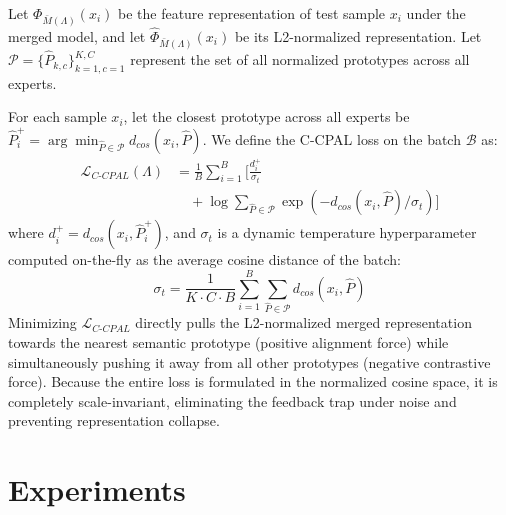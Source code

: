 \documentclass{article}
\theoremstyle{plain}
\theoremstyle{definition}
\theoremstyle{remark}
\begin{document}
Let $\Phi_{\bar{M}(\Lambda)}(x_i)$ be the feature representation of test sample $x_i$ under the merged model, and let $\hat{\Phi}_{\bar{M}(\Lambda)}(x_i)$ be its L2-normalized representation. Let $\mathcal{P} = \{\hat{P}_{k,c}\}_{k=1, c=1}^{K, C}$ represent the set of all normalized prototypes across all experts.

For each sample $x_i$, let the closest prototype across all experts be $\hat{P}_i^+ = \arg\min_{\hat{P} \in \mathcal{P}} d_{cos}(x_i, \hat{P})$.
We define the C-CPAL loss on the batch $\mathcal{B}$ as:
\begin{equation}
\begin{split}
\mathcal{L}_{C\text{-}CPAL}(\Lambda) &= \frac{1}{B} \sum_{i=1}^B \bigg[ \frac{d_i^+}{\sigma_t} \\
&\quad + \log \sum_{\hat{P} \in \mathcal{P}} \exp\left(-d_{cos}(x_i, \hat{P}) / \sigma_t\right) \bigg]
\end{split}
\end{equation}
where $d_i^+ = d_{cos}(x_i, \hat{P}_i^+)$, and $\sigma_t$ is a dynamic temperature hyperparameter computed on-the-fly as the average cosine distance of the batch:
\begin{equation}
\sigma_t = \frac{1}{K \cdot C \cdot B} \sum_{i=1}^B \sum_{\hat{P} \in \mathcal{P}} d_{cos}(x_i, \hat{P})
\end{equation}
Minimizing $\mathcal{L}_{C\text{-}CPAL}$ directly pulls the L2-normalized merged representation towards the nearest semantic prototype (positive alignment force) while simultaneously pushing it away from all other prototypes (negative contrastive force). Because the entire loss is formulated in the normalized cosine space, it is completely scale-invariant, eliminating the feedback trap under noise and preventing representation collapse.

\section{Experiments}
\label{submission:exp}
\end{document}
